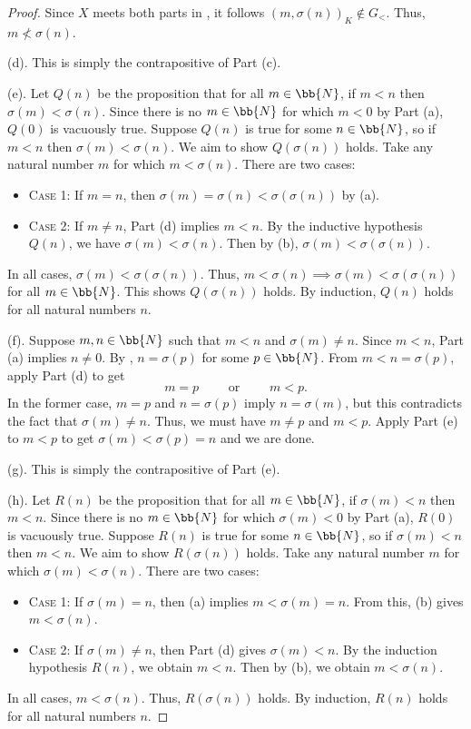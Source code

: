 \begin{proof}
	Since $X$ meets both parts in , it follows $(m, \sigma(n))_{K}\notin G_{<}$. 
	Thus, $m \not< \sigma(n)$. 
	
	(d).
	This is simply the contrapositive of Part (c).
	
	(e).
	Let $Q(n)$ be the proposition that for all $m\in\bb{N}$, if $m < n$ then $\sigma(m) < \sigma(n)$. 
	Since there is no $m\in\bb{N}$ for which $m < 0$ by Part (a), $Q(0)$ is vacuously true.
	Suppose $Q(n)$ is true for some $n\in\bb{N}$, so if $m < n$ then $\sigma(m) < \sigma (n)$. 
	We aim to show $Q(\sigma(n))$ holds. 
	Take any natural number $m$ for which $m < \sigma(n)$.
	There are two cases:
	\begin{itemize}[itemsep=-0.4ex]
		\item\textsc{Case 1:}
		If $m = n$, then $\sigma(m) = \sigma(n) < \sigma(\sigma(n))$ by  (a).
		\item\textsc{Case 2:}
		If $m\ne n$, Part (d) implies $m < n$.
		By the inductive hypothesis $Q(n)$, we have $\sigma(m) < \sigma(n)$.
		Then by  (b), $\sigma(m) < \sigma(\sigma(n))$. 
	\end{itemize}
	In all cases, $\sigma(m) < \sigma(\sigma(n))$. 
	Thus, $m < \sigma(n)\implies \sigma(m) < \sigma(\sigma(n))$ for all $m\in\bb{N}$. 
	This shows $Q(\sigma(n))$ holds. 
	By induction, $Q(n)$ holds for all natural numbers $n$. 
	
	(f).
	Suppose $m, n\in\bb{N}$ such that $m < n$ and $\sigma(m)\ne n$. 
	Since $m < n$, Part (a) implies $n\ne 0$. 
	By , $n = \sigma(p)$ for some $p\in\bb{N}$. 
	From $m < n = \sigma(p)$, apply Part (d) to get 
	\[ m = p \qquad\text{ or }\qquad m < p. \]
	In the former case, $m = p$ and $n = \sigma(p)$ imply $n = \sigma(m)$, but this contradicts the fact that $\sigma(m)\ne n$.
	Thus, we must have $m\ne p$ and $m < p$.
	Apply Part (e) to $m < p$ to get $\sigma(m) < \sigma(p) = n$ and we are done. 
	
	(g).
	This is simply the contrapositive of Part (e).
	
	(h).
	Let $R(n)$ be the proposition that for all $m\in\bb{N}$, if $\sigma(m) < n$ then $m < n$. 
	Since there is no $m\in\bb{N}$ for which $\sigma(m) < 0$ by Part (a), $R(0)$ is vacuously true. 
	Suppose $R(n)$ is true for some $n\in\bb{N}$, so if $\sigma(m) < n$ then $m < n$. 
	We aim to show $R(\sigma(n))$ holds. 
	Take any natural number $m$ for which $\sigma(m) < \sigma(n)$. 
	There are two cases:
	\begin{itemize}[itemsep=-0.4ex]
		\item\textsc{Case 1:}
		If $\sigma(m) = n$, then  (a) implies $m < \sigma(m) = n$. 
		From this,  (b) gives $m < \sigma(n)$. 
		\item\textsc{Case 2:}
		If $\sigma(m)\ne n$, then Part (d) gives $\sigma(m) < n$.
		By the induction hypothesis $R(n)$, we obtain $m < n$.
		Then by  (b), we obtain $m < \sigma(n)$. 
	\end{itemize}
	In all cases, $m < \sigma(n)$.
	Thus, $R(\sigma(n))$ holds. 
	By induction, $R(n)$ holds for all natural numbers $n$. 
	

\end{proof}
